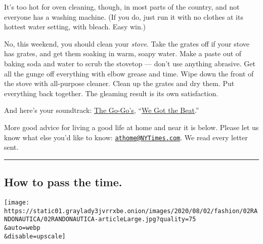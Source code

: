 It's too hot for oven cleaning, though, in most parts of the country,
and not everyone has a washing machine. (If you do, just run it with no
clothes at its hottest water setting, with bleach. Easy win.)

No, this weekend, you should clean your \emph{stove}. Take the grates
off if your stove has grates, and get them soaking in warm, soapy water.
Make a paste out of baking soda and water to scrub the stovetop ---
don't use anything abrasive. Get all the gunge off everything with elbow
grease and time. Wipe down the front of the stove with all-purpose
cleaner. Clean up the grates and dry them. Put everything back together.
The gleaming result is its own satisfaction.

And here's your soundtrack:
\href{https://www.nytimes3xbfgragh.onion/2020/07/29/arts/music/the-go-gos-documentary.html}{The
Go-Go's},
``\href{https://www.youtube.com/watch?v=f55KlPe81Yw\&feature=youtu.be}{We
Got the Beat}.''

More good advice for living a good life at home and near it is below.
Please let us know what else you'd like to know:
\href{mailto:athome@NYTimes.com}{\nolinkurl{athome@NYTimes.com}}. We
read every letter sent.

\begin{center}\rule{0.5\linewidth}{\linethickness}\end{center}

\hypertarget{how-to-pass-the-time}{%
\subsection{How to pass the time.}\label{how-to-pass-the-time}}

\texttt{[image: https://static01.graylady3jvrrxbe.onion/images/2020/08/02/fashion/02RANDONAUTICA/02RANDONAUTICA-articleLarge.jpg?quality=75\\\&auto=webp\\\&disable=upscale]}

